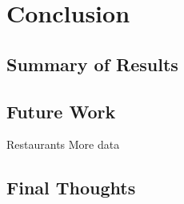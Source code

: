 \chapter{Conclusion}

\section{Summary of Results}

\section{Future Work}
Restaurants
More data
\section{Final Thoughts}